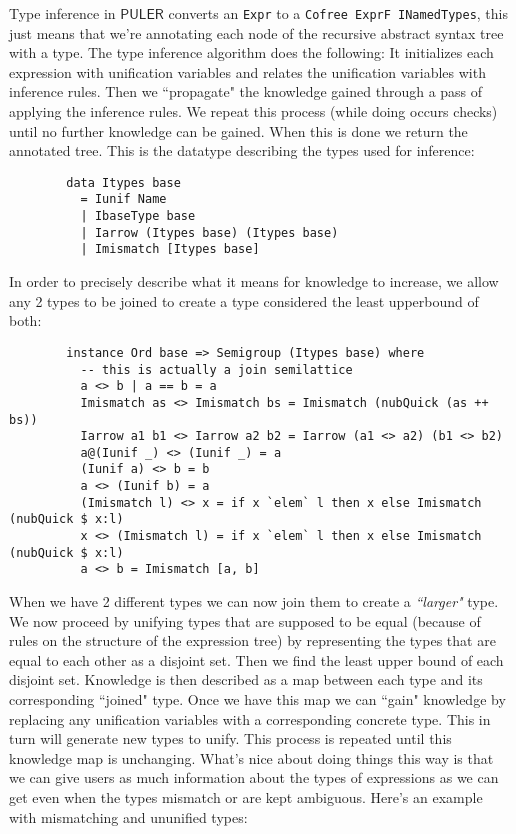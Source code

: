 \documentclass{article} %
\newcommand{\PULER}{\mathsf{PULER}}
\begin{document}
    Type inference in $\PULER$ converts an \texttt{Expr} to a \texttt{Cofree ExprF INamedTypes}, this just means that we're annotating each node of the recursive abstract syntax tree with a type. The type inference algorithm does the following: It initializes each expression with unification variables and relates the unification variables with inference rules. Then we ``propagate" \cite{propagators} the knowledge gained through a pass of applying the inference rules. We repeat this process (while doing occurs checks) until no further knowledge can be gained. When this is done we return the annotated tree. This is the datatype describing the types used for inference:
    \begin{verbatim}
        data Itypes base
          = Iunif Name
          | IbaseType base
          | Iarrow (Itypes base) (Itypes base)
          | Imismatch [Itypes base]
    \end{verbatim}
    In order to precisely describe what it means for knowledge to increase, we allow any 2 types to be joined to create a type considered the least upperbound of both:
    \begin{verbatim}
        instance Ord base => Semigroup (Itypes base) where
          -- this is actually a join semilattice
          a <> b | a == b = a
          Imismatch as <> Imismatch bs = Imismatch (nubQuick (as ++ bs))
          Iarrow a1 b1 <> Iarrow a2 b2 = Iarrow (a1 <> a2) (b1 <> b2)
          a@(Iunif _) <> (Iunif _) = a
          (Iunif a) <> b = b
          a <> (Iunif b) = a
          (Imismatch l) <> x = if x `elem` l then x else Imismatch (nubQuick $ x:l)
          x <> (Imismatch l) = if x `elem` l then x else Imismatch (nubQuick $ x:l)
          a <> b = Imismatch [a, b]
    \end{verbatim}
    When we have 2 different types we can now join them to create a \textit{``larger"} type. We now proceed by unifying types that are supposed to be equal (because of rules on the structure of the expression tree) by representing the types that are equal to each other as a disjoint set. Then we find the least upper bound of each disjoint set. Knowledge is then described as a map between each type and its corresponding ``joined" type. Once we have this map we can ``gain" knowledge by replacing any unification variables with a corresponding concrete type. This in turn will generate new types to unify. This process is repeated until this knowledge map is unchanging. What's nice about doing things this way is that we can give users as much information about the types of expressions as we can get even when the types mismatch or are kept ambiguous. Here's an example with mismatching and ununified types:
\end{document}
